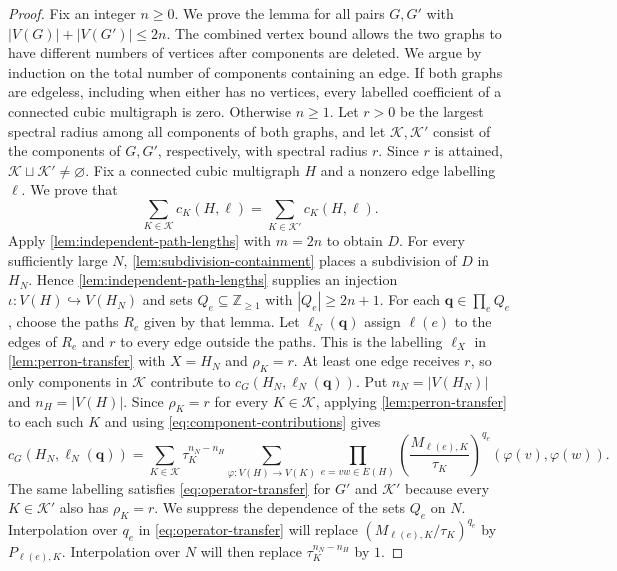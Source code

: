 \documentclass[10pt,a4paper]{article}
\theoremstyle{plain}
\theoremstyle{definition}
\newcommand{\Z}{\mathbb{Z}}
\begin{document}
\begin{proof}
Fix an integer $n\geq0$. We prove the lemma for all pairs $G,G'$ with
$|V(G)|+|V(G')|\leq2n$.
The combined vertex bound allows the two graphs to have different
numbers of vertices after components are deleted.
We argue by induction on the total number of components containing an edge.
If both graphs are edgeless, including when either has no vertices,
every labelled coefficient of a connected cubic multigraph is zero.
Otherwise $n\geq1$. Let $r>0$ be the largest spectral radius among all
components of both graphs, and let $\mathcal K,\mathcal K'$ consist of
the components of $G,G'$, respectively, with spectral radius $r$.
Since $r$ is attained, $\mathcal K\sqcup\mathcal K'\ne\varnothing$.
Fix a connected cubic multigraph $H$ and a nonzero edge labelling $\ell$.
We prove that
\begin{equation}\label{eq:layer-contractions}
 \sum_{K\in\mathcal K}c_K(H,\ell)
 =\sum_{K\in\mathcal K'}c_K(H,\ell).
\end{equation}
Apply \cref{lem:independent-path-lengths} with $m=2n$ to obtain $D$.
For every sufficiently large $N$, \cref{lem:subdivision-containment}
places a subdivision of $D$ in $H_N$.
Hence \cref{lem:independent-path-lengths} supplies an injection
$\iota:V(H)\hookrightarrow V(H_N)$ and sets
$Q_e\subseteq\Z_{\geq1}$ with $|Q_e|\geq2n+1$.
For each $\mathbf q\in\prod_eQ_e$, choose the paths $R_e$ given by that
lemma. Let $\ell_N(\mathbf q)$ assign $\ell(e)$ to the edges of $R_e$
and $r$ to every edge outside the paths.
This is the labelling $\ell_X$ in \cref{lem:perron-transfer} with
$X=H_N$ and $\rho_K=r$.
At least one edge receives $r$, so only components in $\mathcal K$
contribute to $c_G(H_N,\ell_N(\mathbf q))$.
Put $n_N=|V(H_N)|$ and $n_H=|V(H)|$.
Since $\rho_K=r$ for every $K\in\mathcal K$, applying
\cref{lem:perron-transfer} to each such $K$ and using
\cref{eq:component-contributions} gives
\begin{equation}\label{eq:operator-transfer}
 c_G(H_N,\ell_N(\mathbf q))=\sum_{K\in\mathcal K}\tau_K^{n_N-n_H}
   \sum_{\varphi:V(H)\to V(K)}
   \prod_{e=vw\in E(H)}
       \left(\frac{M_{\ell(e),K}}{\tau_K}\right)^{q_e}(\varphi(v),\varphi(w)).
\end{equation}
The same labelling satisfies \cref{eq:operator-transfer} for $G'$ and
$\mathcal K'$ because every $K\in\mathcal K'$ also has $\rho_K=r$.
We suppress the dependence of the sets $Q_e$ on $N$.
Interpolation over $q_e$ in \cref{eq:operator-transfer} will replace
$(M_{\ell(e),K}/\tau_K)^{q_e}$ by $P_{\ell(e),K}$.
Interpolation over $N$ will then replace $\tau_K^{n_N-n_H}$ by $1$.


\end{proof}
\end{document}
